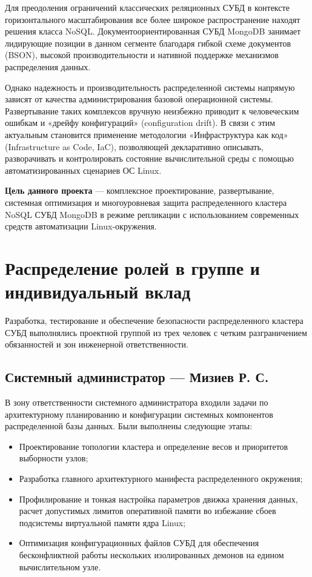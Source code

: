 \documentclass[a4paper,14pt]{extarticle}
\begin{document}
	Для преодоления ограничений классических реляционных СУБД в контексте горизонтального масштабирования все более широкое распространение находят решения класса NoSQL. Документоориентированная СУБД MongoDB занимает лидирующие позиции в данном сегменте благодаря гибкой схеме документов (BSON), высокой производительности и нативной поддержке механизмов распределения данных. 
	
	Однако надежность и производительность распределенной системы напрямую зависят от качества администрирования базовой операционной системы. Развертывание таких комплексов вручную неизбежно приводит к человеческим ошибкам и «дрейфу конфигураций» (configuration drift). В связи с этим актуальным становится применение методологии «Инфраструктура как код» (Infrastructure as Code, IaC), позволяющей декларативно описывать, разворачивать и контролировать состояние вычислительной среды с помощью автоматизированных сценариев ОС Linux.
	
	\textbf{Цель данного проекта} — комплексное проектирование, развертывание, системная оптимизация и многоуровневая защита распределенного кластера NoSQL СУБД MongoDB в режиме репликации с использованием современных средств автоматизации Linux-окружения.
	
	\newpage
	
	\section{Распределение ролей в группе и индивидуальный вклад}
	Разработка, тестирование и обеспечение безопасности распределенного кластера СУБД выполнялись проектной группой из трех человек с четким разграничением обязанностей и зон инженерной ответственности. 
	
	\subsection{Системный администратор — Мизиев Р. С.}
	В зону ответственности системного администратора входили задачи по архитектурному планированию и конфигурации системных компонентов распределенной базы данных. Были выполнены следующие этапы:
	\begin{itemize}
		\item Проектирование топологии кластера и определение весов и приоритетов выборности узлов;
		\item Разработка главного архитектурного манифеста распределенного окружения;
		\item Профилирование и тонкая настройка параметров движка хранения данных, расчет допустимых лимитов оперативной памяти во избежание сбоев подсистемы виртуальной памяти ядра Linux;
		\item Оптимизация конфигурационных файлов СУБД для обеспечения бесконфликтной работы нескольких изолированных демонов на едином вычислительном узле.
	\end{itemize}
	
\end{document}

